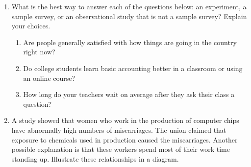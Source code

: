 \documentclass[10pt]{article}
\newcommand{\ans}{\vspace{0.25in}}
\begin{document}
\begin{enumerate}
  \item What is the best way to answer each of the questions below: an experiment, a sample survey, or an observational study that is not a sample survey? Explain your choices.
  \begin{enumerate}
    \itemsep0.25in
    \item Are people generally satisfied with how things are going in the country right now?
    \item Do college students learn basic accounting better in a classroom or using an online course?
    \item How long do your teachers wait on average after they ask their class a question?
    \ans
  \end{enumerate}
  
  \item A study showed that women who work in the production of computer chips have abnormally high numbers of miscarriages. The union claimed that exposure to chemicals used in production caused the miscarriages. Another possible explanation is that these workers spend most of their work time standing up. Illustrate these relationships in a diagram.
  

\end{enumerate}
\end{document}
